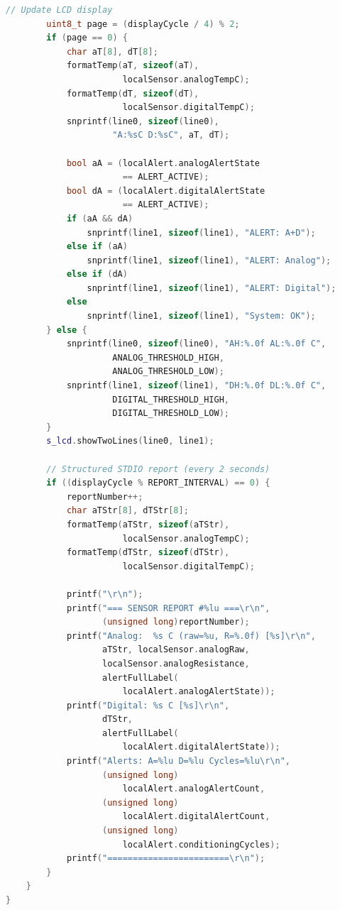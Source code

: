 \begin{lstlisting}[language=C++, caption=task\_display.cpp --- Display and Reporting Task Implementation]
        // Update LCD display
        uint8_t page = (displayCycle / 4) % 2;
        if (page == 0) {
            char aT[8], dT[8];
            formatTemp(aT, sizeof(aT),
                       localSensor.analogTempC);
            formatTemp(dT, sizeof(dT),
                       localSensor.digitalTempC);
            snprintf(line0, sizeof(line0),
                     "A:%sC D:%sC", aT, dT);

            bool aA = (localAlert.analogAlertState
                       == ALERT_ACTIVE);
            bool dA = (localAlert.digitalAlertState
                       == ALERT_ACTIVE);
            if (aA && dA)
                snprintf(line1, sizeof(line1), "ALERT: A+D");
            else if (aA)
                snprintf(line1, sizeof(line1), "ALERT: Analog");
            else if (dA)
                snprintf(line1, sizeof(line1), "ALERT: Digital");
            else
                snprintf(line1, sizeof(line1), "System: OK");
        } else {
            snprintf(line0, sizeof(line0), "AH:%.0f AL:%.0f C",
                     ANALOG_THRESHOLD_HIGH,
                     ANALOG_THRESHOLD_LOW);
            snprintf(line1, sizeof(line1), "DH:%.0f DL:%.0f C",
                     DIGITAL_THRESHOLD_HIGH,
                     DIGITAL_THRESHOLD_LOW);
        }
        s_lcd.showTwoLines(line0, line1);

        // Structured STDIO report (every 2 seconds)
        if ((displayCycle % REPORT_INTERVAL) == 0) {
            reportNumber++;
            char aTStr[8], dTStr[8];
            formatTemp(aTStr, sizeof(aTStr),
                       localSensor.analogTempC);
            formatTemp(dTStr, sizeof(dTStr),
                       localSensor.digitalTempC);

            printf("\r\n");
            printf("=== SENSOR REPORT #%lu ===\r\n",
                   (unsigned long)reportNumber);
            printf("Analog:  %s C (raw=%u, R=%.0f) [%s]\r\n",
                   aTStr, localSensor.analogRaw,
                   localSensor.analogResistance,
                   alertFullLabel(
                       localAlert.analogAlertState));
            printf("Digital: %s C [%s]\r\n",
                   dTStr,
                   alertFullLabel(
                       localAlert.digitalAlertState));
            printf("Alerts: A=%lu D=%lu Cycles=%lu\r\n",
                   (unsigned long)
                       localAlert.analogAlertCount,
                   (unsigned long)
                       localAlert.digitalAlertCount,
                   (unsigned long)
                       localAlert.conditioningCycles);
            printf("========================\r\n");
        }
    }
}
\end{lstlisting}

